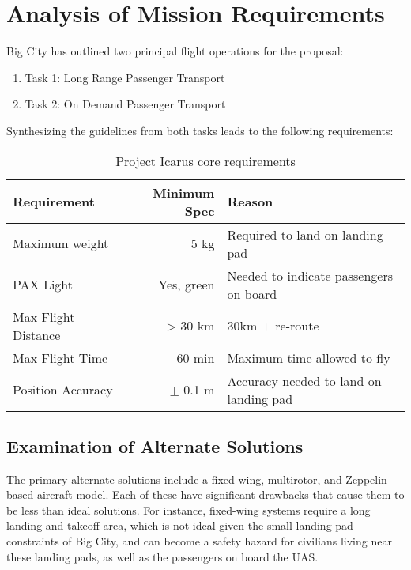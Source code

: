 \section{Analysis of Mission Requirements}
\label{sec:analysis}

Big City has outlined two principal flight operations for the proposal:
\begin{enumerate}
    \item Task 1: Long Range Passenger Transport
    \item Task 2: On Demand Passenger Transport
\end{enumerate}
Synthesizing the guidelines from both tasks leads to the following requirements:

\begin{table}[h]
\centering
\begin{tabular}{lrl}
\color{hyperrideblue} \textbf{Requirement} &
\color{hyperrideblue} \textbf{Minimum Spec} &
\color{hyperrideblue} \textbf{Reason}                   \\ \midrule
    Maximum weight       & 5 kg           & Required to land on landing pad        \\
PAX Light            & Yes, green    & Needed to indicate passengers on-board \\
Max Flight Distance  & > 30 km       & 30km + re-route                        \\
Max Flight Time      & 60 min        & Maximum time allowed to fly            \\
Position Accuracy    & $\pm$ 0.1 m   & Accuracy needed to land on landing pad
\end{tabular}
\caption{Project Icarus core requirements}
\end{table}

\subsection{Examination of Alternate Solutions}
\label{sec:alternate-solutions}

The primary alternate solutions include a fixed-wing, multirotor, and Zeppelin based
aircraft model. Each of these have significant drawbacks that cause them to be less
than ideal solutions. For instance, fixed-wing systems require a long landing and 
takeoff area, which is not ideal given the small-landing pad constraints of Big City, 
and can become a safety hazard for civilians living near these landing pads, as well
as the passengers on board the UAS.

